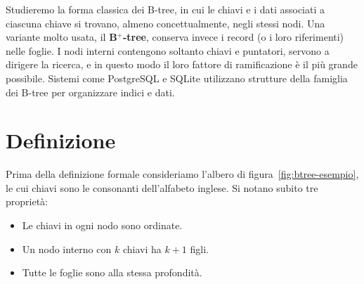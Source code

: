 \begin{osservazione}
Studieremo la forma classica dei B-tree, in cui le chiavi e i dati associati a ciascuna chiave si trovano, almeno concettualmente, negli stessi nodi. Una variante molto usata, il \textbf{B$^+$-tree}, conserva invece i record (o i loro riferimenti) nelle foglie. I nodi interni contengono soltanto chiavi e puntatori, servono a dirigere la ricerca, e in questo modo il loro fattore di ramificazione è il più grande possibile. Sistemi come PostgreSQL e SQLite utilizzano strutture della famiglia dei B-tree per organizzare indici e dati.
\end{osservazione}

\section{Definizione}\label{sec:btree-def}
Prima della definizione formale consideriamo l'albero di figura~\ref{fig:btree-esempio}, le cui chiavi sono le consonanti dell'alfabeto inglese. Si notano subito tre proprietà:
\begin{itemize}
    \item Le chiavi in ogni nodo sono ordinate.
    \item Un nodo interno con $k$ chiavi ha $k+1$ figli.
    \item Tutte le foglie sono alla stessa profondità.
\end{itemize}

